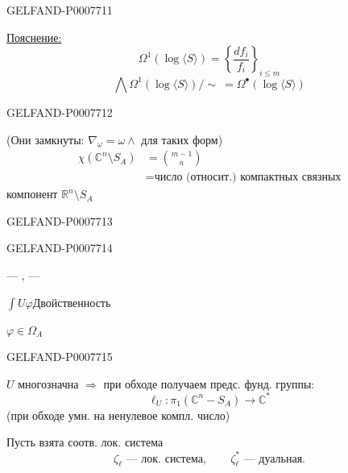 \begin{GelfandAdjacentEvidence}{GELFAND-P000771}{1}

\underline{Пояснение:}
\[
\Omega^1(\log\langle S\rangle)=\left\{\frac{df_i}{f_i}\right\}_{i\le m}
\]
\[
\bigwedge\Omega^1(\log\langle S\rangle)/\sim\ =\Omega^\bullet(\log\langle S\rangle)
\]
\end{GelfandAdjacentEvidence}
\begin{GelfandAdjacentEvidence}{GELFAND-P000771}{2}


(Они замкнуты: \(\nabla_\omega=\omega\wedge\) для таких форм)
\[
\begin{aligned}
\chi(\mathbb C^n\setminus S_A)&=\binom{m-1}{n}\\
&=\text{число (относит.) компактных связных}
\end{aligned}
\]
компонент \(\mathbb R^n\setminus S_A\)
\end{GelfandAdjacentEvidence}
\begin{GelfandAdjacentEvidence}{GELFAND-P000771}{3}

\end{GelfandAdjacentEvidence}
\begin{GelfandAdjacentEvidence}{GELFAND-P000771}{4}


\begin{center}--- , ---\end{center}

\(\displaystyle\int U\varphi\)\qquad [Зачёркнуто: …]\quad Двойственность

\(\varphi\in\Omega_A\)
\end{GelfandAdjacentEvidence}
\begin{GelfandAdjacentEvidence}{GELFAND-P000771}{5}


\(U\) многозначна \(\Rightarrow\) при обходе получаем предс. фунд. группы:
\[
\ell_U:\pi_1(\mathbb C^n-S_A)\longrightarrow\mathbb C^*
\]
(при обходе умн. на ненулевое компл. число)

Пусть взята соотв. лок. система
\[
\zeta_\ell\text{ --- лок. система},\qquad
\zeta_\ell^*\text{ --- дуальная}.
\]
\end{GelfandAdjacentEvidence}
